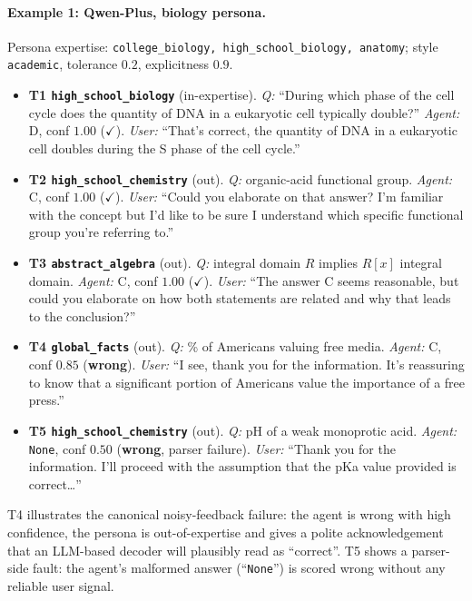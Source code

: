 \documentclass[11pt]{article}
\begin{document}
\paragraph{Example 1: Qwen-Plus, biology persona.} Persona expertise: \texttt{college\_biology, high\_school\_biology, anatomy}; style \texttt{academic}, tolerance $0.2$, explicitness $0.9$.

\begin{itemize}[nosep,leftmargin=1.4em,labelsep=0.4em]
\item \textbf{T1 \texttt{high\_school\_biology}} (in-expertise). \emph{Q:} ``During which phase of the cell cycle does the quantity of DNA in a eukaryotic cell typically double?'' \emph{Agent:} D, conf $1.00$ ($\checkmark$). \emph{User:} ``That's correct, the quantity of DNA in a eukaryotic cell doubles during the S phase of the cell cycle.''
\item \textbf{T2 \texttt{high\_school\_chemistry}} (out). \emph{Q:} organic-acid functional group. \emph{Agent:} C, conf $1.00$ ($\checkmark$). \emph{User:} ``Could you elaborate on that answer? I'm familiar with the concept but I'd like to be sure I understand which specific functional group you're referring to.''
\item \textbf{T3 \texttt{abstract\_algebra}} (out). \emph{Q:} integral domain $R$ implies $R[x]$ integral domain. \emph{Agent:} C, conf $1.00$ ($\checkmark$). \emph{User:} ``The answer C seems reasonable, but could you elaborate on how both statements are related and why that leads to the conclusion?''
\item \textbf{T4 \texttt{global\_facts}} (out). \emph{Q:} \% of Americans valuing free media. \emph{Agent:} C, conf $0.85$ (\textbf{wrong}). \emph{User:} ``I see, thank you for the information. It's reassuring to know that a significant portion of Americans value the importance of a free press.''
\item \textbf{T5 \texttt{high\_school\_chemistry}} (out). \emph{Q:} pH of a weak monoprotic acid. \emph{Agent:} \texttt{None}, conf $0.50$ (\textbf{wrong}, parser failure). \emph{User:} ``Thank you for the information. I'll proceed with the assumption that the pKa value provided is correct\dots''
\end{itemize}

T4 illustrates the canonical noisy-feedback failure: the agent is wrong with high confidence, the persona is out-of-expertise and gives a polite acknowledgement that an LLM-based decoder will plausibly read as ``correct''. T5 shows a parser-side fault: the agent's malformed answer (``\texttt{None}'') is scored wrong without any reliable user signal.
\end{document}
